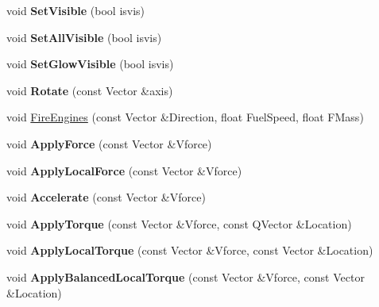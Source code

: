 \begin{DoxyCompactItemize}
\item 
void {\bfseries Set\+Visible} (bool isvis)\hypertarget{classUnit_ae0c7f6e9cc6986d33f28dbe40cb74d64}{}\label{classUnit_ae0c7f6e9cc6986d33f28dbe40cb74d64}

\item 
void {\bfseries Set\+All\+Visible} (bool isvis)\hypertarget{classUnit_a628388e5e6bbcdab31e12f524700305f}{}\label{classUnit_a628388e5e6bbcdab31e12f524700305f}

\item 
void {\bfseries Set\+Glow\+Visible} (bool isvis)\hypertarget{classUnit_a49c9728bca91ecffd60b12321265526b}{}\label{classUnit_a49c9728bca91ecffd60b12321265526b}

\item 
void {\bfseries Rotate} (const Vector \&axis)\hypertarget{classUnit_adedf9974cf8dd6ecb645f8b36eb7ec1a}{}\label{classUnit_adedf9974cf8dd6ecb645f8b36eb7ec1a}

\item 
void \hyperlink{classUnit_a255f7adad1ce1ad8a29799e278e66cad}{Fire\+Engines} (const Vector \&Direction, float Fuel\+Speed, float F\+Mass)
\item 
void {\bfseries Apply\+Force} (const Vector \&Vforce)\hypertarget{classUnit_a8c809ec0970e286bc5a34d6e595940a2}{}\label{classUnit_a8c809ec0970e286bc5a34d6e595940a2}

\item 
void {\bfseries Apply\+Local\+Force} (const Vector \&Vforce)\hypertarget{classUnit_a2de2e994afdfb82425154dd21b98d4c3}{}\label{classUnit_a2de2e994afdfb82425154dd21b98d4c3}

\item 
void {\bfseries Accelerate} (const Vector \&Vforce)\hypertarget{classUnit_ad6070597b67a9e33dab8130a3d3f6b5f}{}\label{classUnit_ad6070597b67a9e33dab8130a3d3f6b5f}

\item 
void {\bfseries Apply\+Torque} (const Vector \&Vforce, const Q\+Vector \&Location)\hypertarget{classUnit_ab8769eb2924d3ec79ac4768ac02dc79a}{}\label{classUnit_ab8769eb2924d3ec79ac4768ac02dc79a}

\item 
void {\bfseries Apply\+Local\+Torque} (const Vector \&Vforce, const Vector \&Location)\hypertarget{classUnit_afbc755bbe7b990ca5a6e35deb5d9a548}{}\label{classUnit_afbc755bbe7b990ca5a6e35deb5d9a548}

\item 
void {\bfseries Apply\+Balanced\+Local\+Torque} (const Vector \&Vforce, const Vector \&Location)\hypertarget{classUnit_a9045d99a80b14cdbcc0341a3c48673e2}{}\label{classUnit_a9045d99a80b14cdbcc0341a3c48673e2}


\end{DoxyCompactItemize}
